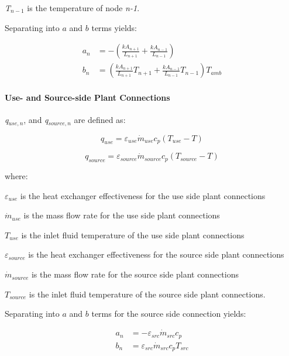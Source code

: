 \emph{T\(_{n-1}\)} is the temperature of node \emph{n-1}.

Separating into $a$ and $b$ terms yields:

\begin{equation}
  \begin{array}{rl}
    a_n &= - \left(\frac{kA_{n+1}}{L_{n+1}} + \frac{kA_{n-1}}{L_{n-1}}\right) \\
    b_n &= \left(\frac{kA_{n+1}}{L_{n+1}} T_{n+1} + \frac{kA_{n-1}}{L_{n-1}} T_{n-1}\right) T_{amb}
  \end{array}
\end{equation}

\paragraph{Use- and Source-side Plant Connections}

\emph{q\(_{use,n}\)}, and \emph{q\(_{source,n}\)} are defined as:

\begin{equation}
{q_{use}} = {\varepsilon_{use}}{\dot m_{use}}{c_p}\left( {{T_{use}} - T} \right)
\end{equation}

\begin{equation}
{q_{source}} = {\varepsilon_{source}}{\dot m_{source}}{c_p}\left( {{T_{source}} - T} \right)
\end{equation}

where:

\({\varepsilon_{use}}\) is the heat exchanger effectiveness for the use side plant connections

\({\dot m_{use}}\) is the mass flow rate for the use side plant connections

\(T_{use}\) is the inlet fluid temperature of the use side plant connections

\({\varepsilon_{source}}\) is the heat exchanger effectiveness for the source side plant connections

\({\dot m_{source}}\) is the mass flow rate for the source side plant connections

\(T_{source}\) is the inlet fluid temperature of the source side plant connections.

Separating into $a$ and $b$ terms for the source side connection yields:

\begin{equation}
  \begin{array}{rl}
    a_n &= - \varepsilon_{src} \dot{m}_{src} c_p \\
    b_n &= \varepsilon_{src} \dot{m}_{src} c_p T_{src}
  \end{array}
\end{equation}

